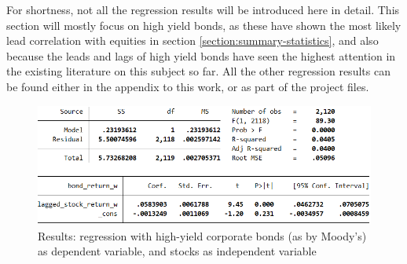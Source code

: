 For shortness, not all the regression results will be introduced here in detail. This section will mostly focus on high yield bonds, as these have shown the most likely lead correlation with equities in section \ref{section:summary-statistics}, and also because the leads and lags of high yield bonds have seen the highest attention in the existing literature on this subject so far. All the other regression results can be found either in the appendix to this work, or as part of the project files. %

\begin{figure}[h]
	\centering
	\includegraphics[trim={0 0 0 0},clip,width=1.0\linewidth]{figures/regression-results/regression-high-yield-ccc-d-moodies-bonds-as-dependent.PNG}
	\caption{Results: regression with high-yield corporate bonds (as by Moody's) as dependent variable, and stocks as independent variable}
	\label{fig:regression-high-yield-ccc-d-moodies-bonds-as-dependent.PNG}
\end{figure}


